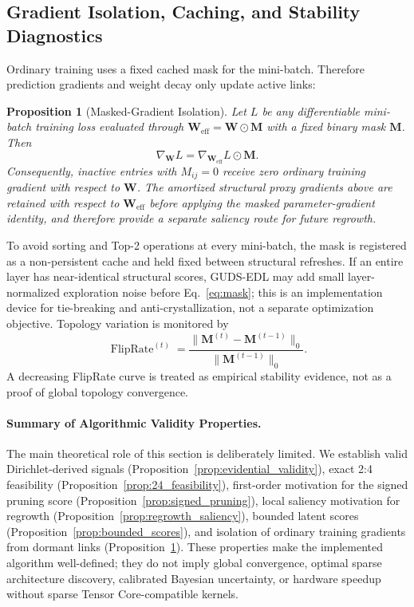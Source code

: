\documentclass[letterpaper]{article} %
\newtheorem{proposition}{Proposition}
\begin{document}
\subsection{Gradient Isolation, Caching, and Stability Diagnostics}
Ordinary training uses a fixed cached mask for the mini-batch. Therefore prediction gradients and weight decay only update active links:
\begin{proposition}[Masked-Gradient Isolation]
\label{prop:masked_gradient}
Let $L$ be any differentiable mini-batch training loss evaluated through $\bm{W}_{\text{eff}}=\bm{W}\odot\bm{M}$ with a fixed binary mask $\bm{M}$. Then
\begin{equation}\label{eq:masked_gradient}
    \nabla_{\bm{W}} L
    =
    \nabla_{\bm{W}_{\text{eff}}} L \odot \bm{M}.
\end{equation}
Consequently, inactive entries with $M_{ij}=0$ receive zero ordinary training gradient with respect to $\bm{W}$. The amortized structural proxy gradients above are retained with respect to $\bm{W}_{\text{eff}}$ before applying the masked parameter-gradient identity, and therefore provide a separate saliency route for future regrowth.
\end{proposition}

To avoid sorting and Top-2 operations at every mini-batch, the mask is registered as a non-persistent cache and held fixed between structural refreshes. If an entire layer has near-identical structural scores, GUDS-EDL may add small layer-normalized exploration noise before Eq.~\ref{eq:mask}; this is an implementation device for tie-breaking and anti-crystallization, not a separate optimization objective. Topology variation is monitored by
\begin{equation}\label{eq:flip_rate}
    \operatorname{FlipRate}^{(t)}
    =
    \frac{\|\bm{M}^{(t)}-\bm{M}^{(t-1)}\|_0}
    {\|\bm{M}^{(t-1)}\|_0}.
\end{equation}
A decreasing FlipRate curve is treated as empirical stability evidence, not as a proof of global topology convergence.

\paragraph{Summary of Algorithmic Validity Properties.}
The main theoretical role of this section is deliberately limited. We establish valid Dirichlet-derived signals (Proposition~\ref{prop:evidential_validity}), exact 2:4 feasibility (Proposition~\ref{prop:24_feasibility}), first-order motivation for the signed pruning score (Proposition~\ref{prop:signed_pruning}), local saliency motivation for regrowth (Proposition~\ref{prop:regrowth_saliency}), bounded latent scores (Proposition~\ref{prop:bounded_scores}), and isolation of ordinary training gradients from dormant links (Proposition~\ref{prop:masked_gradient}). These properties make the implemented algorithm well-defined; they do not imply global convergence, optimal sparse architecture discovery, calibrated Bayesian uncertainty, or hardware speedup without sparse Tensor Core-compatible kernels.
\end{document}
